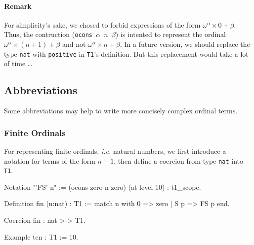 \paragraph{Remark}
For simplicity's sake, we chosed to forbid  expressions of the form $\omega^\alpha\times 0 + \beta$. Thus, the contruction (\texttt{ocons $\alpha$ $n$ $\beta$}) is intented to represent the
ordinal $\omega^\alpha\times(n+1)+\beta$ and not $\omega^\alpha\times n+\beta$.
In a future version, we should replace  the type \texttt{nat} with \texttt{positive} in \texttt{T1}'s 
definition. But this replacement would take a lot of time \dots{}

\subsection{Abbreviations}

Some abbreviations may help to write more concisely complex ordinal terms.

\subsubsection{Finite Ordinals}
\label{sec:orgheadline67}

For representing finite ordinals, \emph{i.e.} natural numbers, we first introduce a notation for terms of the form $n+1$, then define a coercion from type \texttt{nat} into \texttt{T1}.
\label{sect:notation-FS}

\begin{Coqsrc}
Notation "'FS' n" :=
     (ocons zero n zero) (at level 10) : t1_scope.
\end{Coqsrc}

\label{sect:notation-F}

\begin{Coqsrc}
Definition fin (n:nat) : T1 := 
    match n with 0 => zero | S p => FS p end. 

Coercion fin  : nat >-> T1.

Example ten : T1 := 10.   
\end{Coqsrc}



